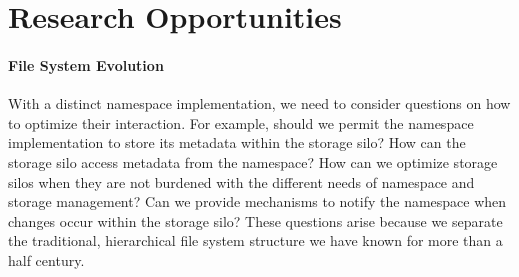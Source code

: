 \section{Research Opportunities}\label{sec:research}



\paragraph{File System Evolution}

With a distinct namespace implementation, we need to consider questions on how to optimize their interaction.
For example, should we permit the namespace implementation to store its metadata within the storage silo?
How can the storage silo access metadata from the namespace?  How can we optimize storage silos when
they are not burdened with the different needs of namespace and storage management?  Can we provide
mechanisms to notify the namespace when changes occur within the storage silo?
These questions arise because we separate the traditional, hierarchical file system structure we have known for more than a half century.

